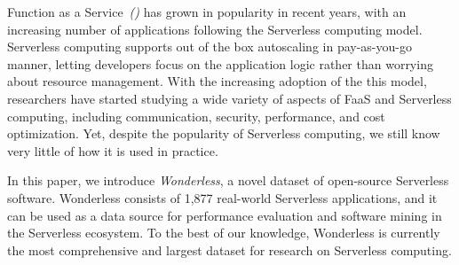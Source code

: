 %
%
Function as a Service~\emph{(\faas)} has grown in popularity in recent years, 
with an increasing number of applications following the Serverless computing model. 
Serverless computing supports out of the box autoscaling in pay-as-you-go manner, 
letting developers focus on the application logic rather than worrying 
about resource management. 
%
With the increasing adoption of the this model, researchers have started 
studying a wide variety of aspects of FaaS and Serverless computing, 
including communication, security, performance, and cost optimization. 
Yet, despite the popularity of Serverless computing, we still know very little of how it 
is used in practice.

In this paper, we introduce \emph{Wonderless}, a novel dataset
of open-source Serverless software. 
Wonderless consists of 1,877 real-world Serverless applications, 
and it can be used as a data source for performance evaluation and 
software mining in the Serverless ecosystem. To the best of our knowledge, 
Wonderless is currently the most comprehensive and largest dataset
for research on Serverless computing.


